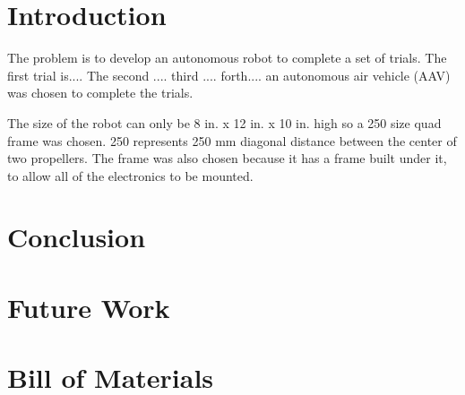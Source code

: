 \documentclass{article}
\begin{document}
\clearpage

\section{Introduction}

	The problem is to develop an autonomous robot to complete a set of trials. The first trial is.... The second .... third .... forth.... an autonomous air vehicle (AAV) was chosen to complete the trials. 
	
	The size of the robot can only be 8 in. x 12 in. x 10 in. high so a 250 size quad frame 
	was chosen. 250 represents 250 mm diagonal distance between the center of two propellers.
	The frame was also chosen because it has a frame built under it, to allow all of the
	electronics to be mounted.

\section{Conclusion}


\section{Future Work}

\section{Bill of Materials}
\end{document}
